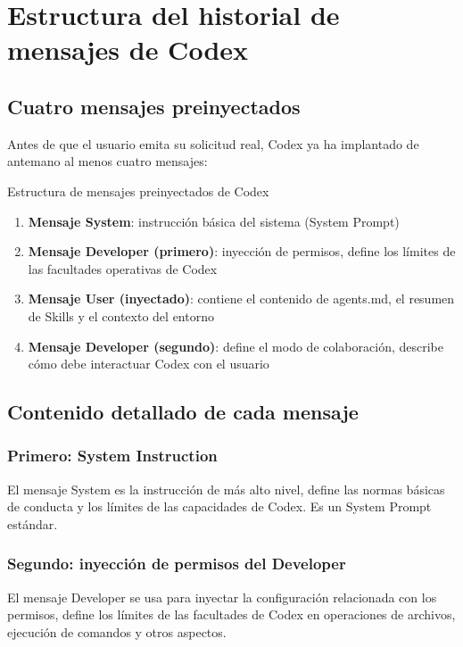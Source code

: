 \section{Estructura del historial de mensajes de Codex}

\subsection{Cuatro mensajes preinyectados}

Antes de que el usuario emita su solicitud real, Codex ya ha implantado de antemano al menos cuatro mensajes:

\begin{importantbox}{Estructura de mensajes preinyectados de Codex}
\begin{enumerate}
    \item \textbf{Mensaje System}: instrucción básica del sistema (System Prompt)
    \item \textbf{Mensaje Developer (primero)}: inyección de permisos, define los límites de las facultades operativas de Codex
    \item \textbf{Mensaje User (inyectado)}: contiene el contenido de agents.md, el resumen de Skills y el contexto del entorno
    \item \textbf{Mensaje Developer (segundo)}: define el modo de colaboración, describe cómo debe interactuar Codex con el usuario
\end{enumerate}
\end{importantbox}

\subsection{Contenido detallado de cada mensaje}

\subsubsection{Primero: System Instruction}

El mensaje System es la instrucción de más alto nivel, define las normas básicas de conducta y los límites de las capacidades de Codex. Es un System Prompt estándar.

\subsubsection{Segundo: inyección de permisos del Developer}

El mensaje Developer se usa para inyectar la configuración relacionada con los permisos, define los límites de las facultades de Codex en operaciones de archivos, ejecución de comandos y otros aspectos.

